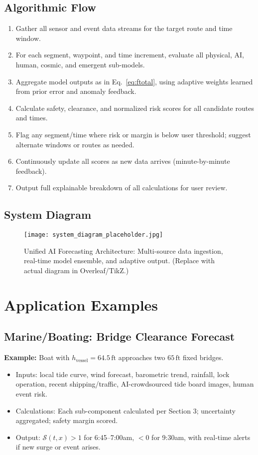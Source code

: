 \documentclass[12pt]{article}
\begin{document}
\subsection{Algorithmic Flow}
\begin{enumerate}
\item Gather all sensor and event data streams for the target route and time window.
\item For each segment, waypoint, and time increment, evaluate all physical, AI, human, cosmic, and emergent sub-models.
\item Aggregate model outputs as in Eq.~\ref{eq:ftotal}, using adaptive weights learned from prior error and anomaly feedback.
\item Calculate safety, clearance, and normalized risk scores for all candidate routes and times.
\item Flag any segment/time where risk or margin is below user threshold; suggest alternate windows or routes as needed.
\item Continuously update all scores as new data arrives (minute-by-minute feedback).
\item Output full explainable breakdown of all calculations for user review.
\end{enumerate}

\subsection{System Diagram}
\begin{figure}[h!]
\centering
\texttt{[image: system\_diagram\_placeholder.jpg]}
\caption{Unified AI Forecasting Architecture: Multi-source data ingestion, real-time model ensemble, and adaptive output. (Replace with actual diagram in Overleaf/TikZ.)}
\end{figure}

\section{Application Examples}

\subsection{Marine/Boating: Bridge Clearance Forecast}
\textbf{Example:} Boat with $h_{\text{vessel}}=64.5\,\mathrm{ft}$ approaches two $65\,\mathrm{ft}$ fixed bridges.
\begin{itemize}
    \item Inputs: local tide curve, wind forecast, barometric trend, rainfall, lock operation, recent shipping/traffic, AI-crowdsourced tide board images, human event risk.
    \item Calculations: Each sub-component calculated per Section 3; uncertainty aggregated; safety margin scored.
    \item Output: $\mathcal{S}(t, x)>1$ for 6:45--7:00am, $<0$ for 9:30am, with real-time alerts if new surge or event arises.
\end{itemize}
\end{document}
